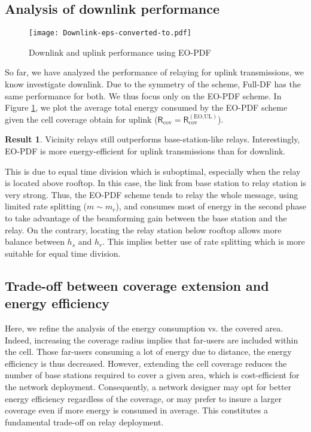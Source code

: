 \documentclass[journal]{IEEEtran}
\theoremstyle{definition}
\newtheorem{result}{Result}
\begin{document}
\subsection{Analysis of downlink performance}


\begin{figure}
	\centering
	\texttt{[image: Downlink-eps-converted-to.pdf]} 
	\caption{Downlink and uplink performance using EO-PDF}  
	\label{fig:downlink} 
\end{figure}

So far, we have analyzed the performance of relaying for uplink transmissions, we know investigate downlink. Due to the symmetry of the scheme, Full-DF has the same performance for both. We thus focus only on the EO-PDF scheme.
In Figure \ref{fig:downlink}, we plot the average total energy consumed by the EO-PDF scheme given the cell coverage obtain for uplink ($\mathsf{R}_{\text{cov}}= \mathsf{R}_{\text{cov}}^{(\text{EO,UL})}$).\vspace*{-5pt}\begin{result}
Vicinity relays still outperforms base-station-like relays. Interestingly, EO-PDF is more energy-efficient for uplink transmissions than for downlink.
\end{result} \vspace*{-5pt} \noindent
This is due to equal time division which is suboptimal, especially when the relay is located above rooftop. In this case, the link from base station to relay station is very strong. Thus, the EO-PDF scheme tends to relay the whole message, using limited rate splitting ($m \sim m_r$), and consumes most of energy in the second phase to take advantage of the beamforming gain between the base station and the relay. On the contrary, locating the relay station below rooftop allows more balance between $h_s$ and $h_r$. This implies better use of rate splitting which is more suitable for equal time division.






\subsection{Trade-off between coverage extension and energy efficiency}

Here, we refine the analysis of the energy consumption vs.
the covered area.
Indeed, increasing the coverage radius implies that far-users are included within the cell. Those far-users consuming a lot of energy due to distance, the energy efficiency is thus decreased. However, extending the cell coverage reduces the number of base stations required to cover a given area, which is cost-efficient for the network deployment.
Consequently, a network designer may opt for better energy efficiency regardless of the coverage, or may prefer to insure a larger coverage even if more energy is consumed in average. 
This constitutes a fundamental trade-off on relay deployment. 
\end{document}
